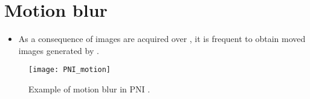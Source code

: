 \section{Motion blur}
\begin{itemize}
\item As a consequence of images are acquired over , it is frequent to obtain
  moved images generated by .
\end{itemize}
\vspace{-1ex}
\begin{figure}[H]
  \centering
  \texttt{[image: PNI\_motion]}
  \caption{Example of motion blur in \gls{PNI}
    \cite{naddaf2004technical}.}
  \label{PNI_motion}
\end{figure}
